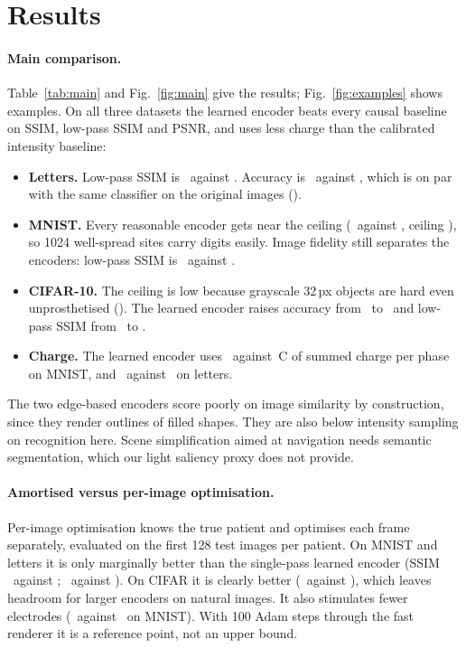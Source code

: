 \section{Results}\label{sec:results}
\GenMainTable

\paragraph{Main comparison.} Table~\ref{tab:main} and Fig.~\ref{fig:main} give the results; Fig.~\ref{fig:examples} shows examples. On all three datasets the learned encoder beats every causal baseline on SSIM, low-pass SSIM and PSNR, and uses less charge than the calibrated intensity baseline:
\begin{itemize}
\item \textbf{Letters.} Low-pass SSIM is \NumLettersLearnLp\ against \NumLettersIntLp. Accuracy is \NumLettersLearnAcc\ against \NumLettersIntAcc, which is on par with the same classifier on the original images (\NumLettersCeil).
\item \textbf{MNIST.} Every reasonable encoder gets near the ceiling (\NumMnistLearnAcc\ against \NumMnistIntAcc, ceiling \NumMnistCeil), so 1024 well-spread sites carry digits easily. Image fidelity still separates the encoders: low-pass SSIM is \NumMnistLearnLp\ against \NumMnistIntLp.
\item \textbf{CIFAR-10.} The ceiling is low because grayscale 32\,px objects are hard even unprosthetised (\NumCifarCeil). The learned encoder raises accuracy from \NumCifarIntAcc\ to \NumCifarLearnAcc\ and low-pass SSIM from \NumCifarIntLp\ to \NumCifarLearnLp.
\item \textbf{Charge.} The learned encoder uses \NumMnistLearnCharge\ against \NumMnistIntCharge\,\textmu C of summed charge per phase on MNIST, and \NumLettersLearnCharge\ against \NumLettersIntCharge\ on letters.
\end{itemize}
The two edge-based encoders score poorly on image similarity by construction, since they render outlines of filled shapes. They are also below intensity sampling on recognition here. Scene simplification aimed at navigation \citep{han2021deep} needs semantic segmentation, which our light saliency proxy does not provide.

\paragraph{Amortised versus per-image optimisation.} Per-image optimisation knows the true patient and optimises each frame separately, evaluated on the first 128 test images per patient. On MNIST and letters it is only marginally better than the single-pass learned encoder (SSIM \NumMnistOracleSsim\ against \NumMnistLearnSsim; \NumLettersOracleSsim\ against \NumLettersLearnSsim). On CIFAR it is clearly better (\NumCifarOracleSsim\ against \NumCifarLearnSsim), which leaves headroom for larger encoders on natural images. It also stimulates fewer electrodes (\NumMnistOracleActive\ against \NumMnistLearnActive\ on MNIST). With 100 Adam steps through the fast renderer it is a reference point, not an upper bound.

